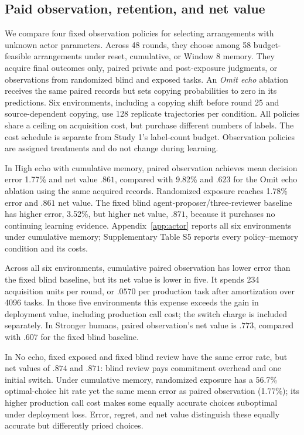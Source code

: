 \subsection{Paid observation, retention, and net value}
\label{sec:actor-learning}
We compare four fixed observation policies for selecting arrangements with unknown actor parameters. Across 48 rounds, they choose among 58 budget-feasible arrangements under reset, cumulative, or Window 8 memory. They acquire final outcomes only, paired private and post-exposure judgments, or observations from randomized blind and exposed tasks. An \emph{Omit echo} ablation receives the same paired records but sets copying probabilities to zero in its predictions. Six environments, including a copying shift before round 25 and source-dependent copying, use 128 replicate trajectories per condition. All policies share a ceiling on acquisition cost, but purchase different numbers of labels. The cost schedule is separate from Study 1's label-count budget. Observation policies are assigned treatments and do not change during learning.

In High echo with cumulative memory, paired observation achieves mean decision error 1.77\% and net value $.861$, compared with 9.82\% and $.623$ for the Omit echo ablation using the same acquired records. Randomized exposure reaches 1.78\% error and $.861$ net value. The fixed blind agent-proposer/three-reviewer baseline has higher error, 3.52\%, but higher net value, $.871$, because it purchases no continuing learning evidence. Appendix~\ref{app:actor} reports all six environments under cumulative memory; Supplementary Table S5 reports every policy--memory condition and its costs.

Across all six environments, cumulative paired observation has lower error than the fixed blind baseline, but its net value is lower in five. It spends 234 acquisition units per round, or $.0570$ per production task after amortization over 4096 tasks. In those five environments this expense exceeds the gain in deployment value, including production call cost; the switch charge is included separately. In Stronger humans, paired observation's net value is $.773$, compared with $.607$ for the fixed blind baseline.

In No echo, fixed exposed and fixed blind review have the same error rate, but net values of $.874$ and $.871$: blind review pays commitment overhead and one initial switch. Under cumulative memory, randomized exposure has a 56.7\% optimal-choice hit rate yet the same mean error as paired observation (1.77\%); its higher production call cost makes some equally accurate choices suboptimal under deployment loss. Error, regret, and net value distinguish these equally accurate but differently priced choices.


